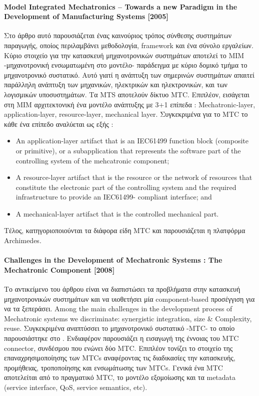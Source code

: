 \documentclass[a4paper,12pt,twoside]{report}
\begin{document}
{				\paragraph{Model Integrated Mechatronics – Towards a new Paradigm in the Development of Manufacturing Systems [2005]}{Στο άρθρο αυτό παρουσιάζεται ένας καινούριος τρόπος σύνθεσης συστημάτων παραγωγής, οποίος περιλαμβάνει μεθοδολογία, framework και ένα σύνολο εργαλείων. Κύριο στοιχείο για την κατασκευή μηχανοτρονικών συστημάτων αποτελεί το MIM -μηχανοτρονική ενσωματωμένη στο μοντέλο- παράδειγμα  με κύριο δομικό τμήμα το μηχανοτρονικό συστατικό. Αυτό γιατί η ανάπτυξη των σημερινών συστημάτων απαιτεί παράλληλη ανάπτυξη των μηχανικών, ηλεκτρικών και ηλεκτρονικών, και των λογισμικών υποσυστημάτων. Τα MTS αποτελούν δίκτυο MTC. Επιπλέον, εισάγεται στη MIM αρχιτεκτονική ένα μοντέλο ανάπτυξης με 3+1 επίπεδα : Mechatronic-layer, application-layer, resource-layer, mechanical layer. Συγκεκριμένα για το MTC το κάθε ένα επίπεδο αναλύεται ως εξής :
				\begin{itemize}				
					\item An application-layer artifact that is an IEC61499 function block (composite or primitive), or a subapplication
that represents the software part of the controlling system of the mehcatronic
component;
					\item A resource-layer artifact that is the resource or the network of resources that constitute the
electronic part of the controlling system and the required infrastructure to provide an IEC61499-
compliant interface; and
					\item A mechanical-layer artifact that is the controlled mechanical part.
				\end{itemize}
Τέλος, κατηγοριοποιούνται τα διάφορα είδη MTC και παρουσιάζεται η πλατφόρμα Archimedes. \cite{ModelIntegratedMechatronics:Thramboulidis2005}
				}
				
				\paragraph{Challenges in the Development of Mechatronic
Systems : The Mechatronic Component [2008]}{Το αντικείμενο του άρθρου είναι να διαπιστώσει τα προβλήματα στην κατασκευή μηχανοτρονικών συστημάτων και να υιοθετήσει μία component-based προσέγγιση για να τα ξεπεράσει. Among the main challenges in the development process of Mechatronic systems we discriminate: synergistic integration, size \& Complexity, reuse. Συγκεκριμένα αναπτύσσει το μηχανοτρονικό συστατικό -MTC- το οποίο παρουσιάστηκε στο \cite{ModelIntegratedMechatronics:Thramboulidis2005}. Ενδιαφέρον παρουσιάζει η εισαγωγή της έννοιας του MTC connector, συνδέσμου που ενώνει δύο MTC. \linebreak Επιπλέον τονίζει το στοιχείο της επαναχρησιμοποίησης των MTCs αναφέροντας τις διαδικασίες την κατασκευής, προμήθειας, τροποποίησης και ενσωμάτωσης των MTCs. Γενικά ένα MTC αποτελείται από το πραγματικό MTC, το μοντέλο εξομοίωσης και τα metadata (service interface, QoS, service semantics,
etc).  \cite{TheMechatronicComponent:Thramboulidis2008}
				}
				
}
\end{document}
